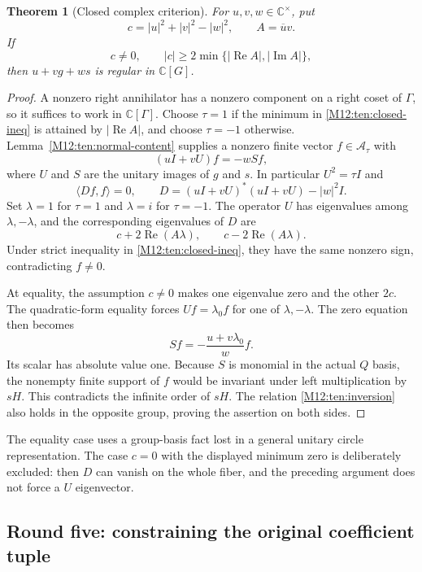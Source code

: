 \documentclass[11pt,a4paper,oneside]{report}
\newtheorem{theorem}{Theorem}[section]
\theoremstyle{definition}
\theoremstyle{remark}
\begin{document}
\begin{theorem}[Closed complex criterion]\label{M12:ten:closed-criterion}
For $u,v,w\in\mathbb C^\times$, put
\[
c=|u|^2+|v|^2-|w|^2,\qquad A=\overline u v.
\]
If
\begin{equation}\label{M12:ten:closed-ineq}
c\ne0,\qquad
|c|\ge 2\min\{ |\operatorname{Re}A|,
                    |\operatorname{Im}A|\},
\end{equation}
then $u+vg+ws$ is regular in $\mathbb C[G]$.
\end{theorem}
\begin{proof}
A nonzero right annihilator has a nonzero component on a right coset
of $\Gamma$, so it suffices to work in $\mathbb C[\Gamma]$.
Choose $\tau=1$ if the minimum in \eqref{M12:ten:closed-ineq} is attained
by $|\operatorname{Re}A|$, and choose $\tau=-1$ otherwise.
Lemma~\ref{M12:ten:normal-content} supplies a nonzero finite vector
$f\in\mathcal A_\tau$ with
\[
(uI+vU)f=-wSf,
\]
where $U$ and $S$ are the unitary images of $g$ and $s$.
In particular $U^2=\tau I$ and
\[
\langle Df,f\rangle=0,\qquad
D=(uI+vU)^*(uI+vU)-|w|^2I.
\]
Set $\lambda=1$ for $\tau=1$ and $\lambda=i$ for $\tau=-1$.
The operator $U$ has eigenvalues among $\lambda,-\lambda$, and
the corresponding eigenvalues of $D$ are
\[
c+2\operatorname{Re}(A\lambda),\qquad
c-2\operatorname{Re}(A\lambda).
\]
Under strict inequality in \eqref{M12:ten:closed-ineq}, they have the
same nonzero sign, contradicting $f\ne0$.

At equality, the assumption $c\ne0$ makes one eigenvalue zero and
the other $2c$. The quadratic-form equality forces
$Uf=\lambda_0f$ for one of $\lambda,-\lambda$. The zero equation
then becomes
\[
Sf=-\frac{u+v\lambda_0}{w}f.
\]
Its scalar has absolute value one. Because $S$ is monomial in the
actual $Q$ basis, the nonempty finite support of $f$ would be
invariant under left multiplication by $sH$. This contradicts the
infinite order of $sH$. The relation \eqref{M12:ten:inversion} also
holds in the opposite group, proving the assertion on both sides.
\end{proof}

The equality case uses a group-basis fact lost in a general unitary
circle representation. The case $c=0$ with the displayed minimum
zero is deliberately excluded: then $D$ can vanish on the whole
fiber, and the preceding argument does not force a $U$ eigenvector.

\subsection{Round five: constraining the original coefficient tuple}
\end{document}
